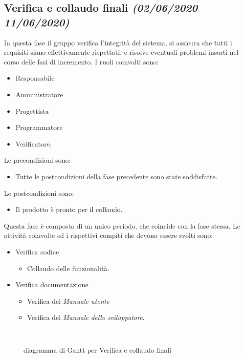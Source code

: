 \documentclass[../piano-di-progetto.tex]{subfiles}
\begin{document}
\subsection[Verifica e collaudo finali]{Verifica e collaudo finali {\normalsize\normalfont\itshape(02/06/2020  11/06/2020)}}%
\label{sub:verifica_e_collaudo_finali}
In questa fase il gruppo verifica l'integrità del sistema, si assicura che tutti i requisiti siano effettivamente rispettati, e risolve eventuali problemi insorti nel corso delle fasi di incremento.
I ruoli coinvolti sono:
\begin{itemize}
  \item Responsabile
  \item Amministratore
  \item Progettista
  \item Programmatore
  \item Verificatore.
\end{itemize}
Le precondizioni sono:
\begin{itemize}
  \item Tutte le postcondizioni della fase precedente sono state soddisfatte.
\end{itemize}
Le postcondizioni sono:
\begin{itemize}
  \item Il prodotto è pronto per il collaudo.
\end{itemize}
Questa fase è composta di un unico periodo, che coincide con la fase stessa.
Le attività coinvolte ed i rispettivi compiti che devono essere svolti sono:
\begin{itemize}
  \item Verifica codice
  \begin{itemize}
    \item Collaudo delle funzionalità.
  \end{itemize}
  \item Verifica documentazione
  \begin{itemize}
    \item Verifica del \textit{Manuale utente}
    \item Verifica del \textit{Manuale dello sviluppatore}.
  \end{itemize}
\end{itemize}
\begin{figure}[H]
  \centering
  
  \caption{diagramma di Gantt per Verifica e collaudo finali}%
~~\label{fig:gantt_verifica_e_collaudo_finali}
\end{figure}
\end{document}
